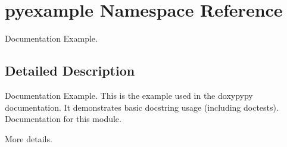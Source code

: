 \hypertarget{namespacepyexample}{\section{pyexample \-Namespace \-Reference}
\label{namespacepyexample}
}


\-Documentation \-Example.  




\subsection{\-Detailed \-Description}
\-Documentation \-Example. \-This is the example used in the doxypypy documentation. \-It demonstrates basic docstring usage (including doctests). \-Documentation for this module.

\-More details. 